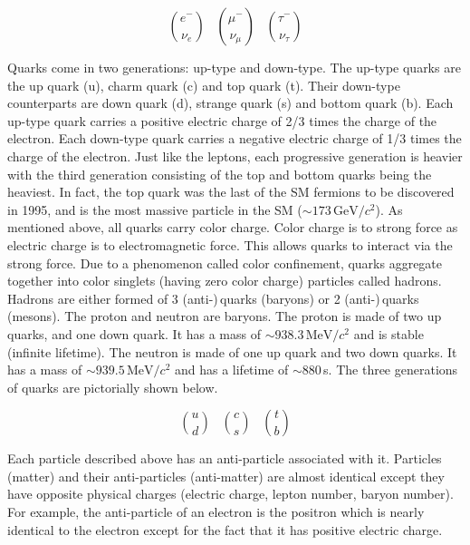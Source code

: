 \begin{equation*}                                                                                                                          
 \binom{e^{-}}{\nu_{e}} \;\;\; \binom{\mu^{-}}{\nu_{\mu}} \;\;\; \binom{\tau^{-}}{\nu_{\tau}}                                           
 \end{equation*}

Quarks come in two generations: up-type and down-type. The up-type quarks are the up quark (u), charm quark (c) and top quark (t). Their down-type counterparts are down quark (d), strange quark (s) and bottom quark (b). Each up-type quark carries a positive electric charge of 2/3 times the charge of the electron. Each down-type quark carries a negative electric charge of 1/3 times the charge of the electron. Just like the leptons, each progressive generation is heavier with the third generation consisting of the top and bottom quarks being the heaviest. In fact, the top quark was the last of the SM fermions to be discovered in 1995, and is the most massive particle in the SM ($\sim 173\,\mathrm{GeV}/c^2$). As mentioned above, all quarks carry color charge. Color charge is to strong force as electric charge is to electromagnetic force. This allows quarks to interact via the strong force. Due to a phenomenon called color confinement, quarks aggregate together into color singlets (having zero color charge) particles called hadrons. Hadrons are either formed of 3 (anti-)\,quarks (baryons) or 2 (anti-)\,quarks (mesons). The proton and neutron are baryons. The proton is made of two up quarks, and one down quark. It has a mass of $\sim 938.3\,\mathrm{MeV}/c^2$ and is stable (infinite lifetime). The neutron is made of one up quark and two down quarks. It has a mass of $\sim 939.5\,\mathrm{MeV}/c^2$ and has a lifetime of $\sim880\,$s. The three generations of quarks are pictorially shown below.

\begin{equation*}
  \binom{u}{d} \;\;\; \binom{c}{s} \;\;\; \binom{t}{b}
\end{equation*}

Each particle described above has an anti-particle associated with it. Particles (matter) and their anti-particles (anti-matter) are almost identical except they have opposite physical charges (electric charge, lepton number, baryon number). For example, the anti-particle of an electron is the positron which is nearly identical to the electron except for the fact that it has positive electric charge.

